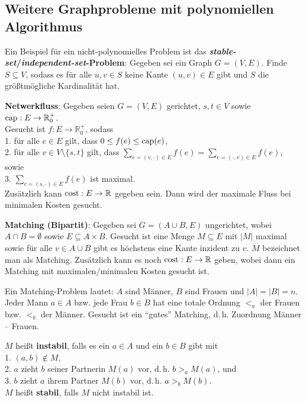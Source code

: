 \subsection{%
    Weitere Graphprobleme mit polynomiellen Algorithmus%
}

Ein Beispiel für ein nicht-polynomielles Problem ist
das \textbf{\emph{stable-set}/\emph{independent-set}-Pro\-blem}:
Gegeben sei ein Graph $G = (V, E)$.
Finde $S \subseteq V$, sodass es für alle $u, v \in S$ keine Kante
$(u, v) \in E$ gibt und $S$ die größtmögliche Kardinalität hat.

\linie

\textbf{Netwerkfluss}:
Gegeben seien $G = (V, E)$ gerichtet, $s, t \in V$ sowie
$\operatorname{cap}: E \rightarrow \mathbb{R}_0^+$. \\
Gesucht ist $f: E \rightarrow \mathbb{R}_0^+$, sodass \\
1. \quad für alle $e \in E$ gilt, dass $0 \le f(e) \le \operatorname{cap}(e)$, \\
2. \quad für alle $v \in V \setminus \{s, t\}$ gilt, dass
$\sum_{e = (v, \cdot) \in E} f(e) = \sum_{e = (\cdot, v) \in E} f(e)$, sowie \\
3. \quad $\sum_{e = (s, \cdot) \in E} f(e)$ ist maximal. \\
Zusätzlich kann $\operatorname{cost}: E \rightarrow \mathbb{R}$ gegeben sein.
Dann wird der maximale Fluss bei minimalen Kosten gesucht.

\linie
\pagebreak

\textbf{Matching (Bipartit)}:
Gegeben sei $G = (A \cup B, E)$ ungerichtet, wobei
$A \cap B = \emptyset$ sowie $E \subseteq A \times B$.
Gesucht ist eine Menge $M \subseteq E$ mit $|M|$ maximal sowie
für alle $v \in A \cup B$ gibt es höchstens eine Kante inzident zu $v$.
$M$ bezeichnet man als Matching.
Zusätzlich kann es noch $\operatorname{cost}: E \rightarrow \mathbb{R}$ geben, wobei
dann ein Matching mit maximalen/minimalen Kosten gesucht ist.

Ein Matching-Problem lautet:
$A$ sind Männer, $B$ sind Frauen und $|A| = |B| = n$.
Jeder Mann $a \in A$ bzw. jede Frau $b \in B$ hat eine totale Ordnung
$<_a$ der Frauen bzw. $<_b$ der Männer.
Gesucht ist ein "`gutes"' Matching, d.\,h. Zuordnung Männer -- Frauen.

$M$ heißt \textbf{instabil}, falls es ein $a \in A$ und ein $b \in B$ gibt
mit \\
1. \quad $(a, b) \notin M$, \\
2. \quad $a$ zieht $b$ seiner Partnerin $M(a)$ vor, d.\,h. $b >_a M(a)$, und \\
3. \quad $b$ zieht $a$ ihrem Partner $M(b)$ vor, d.\,h. $a >_b M(b)$. \\
$M$ heißt \textbf{stabil}, falls $M$ nicht instabil ist.

